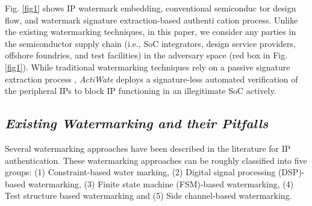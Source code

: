 \documentclass[onecolumn]{IEEEtran}
\begin{document}
 Fig. \ref{fig1} shows IP watermark embedding, conventional semiconduc
tor design flow, and watermark signature extraction-based authenti
cation process. Unlike the existing watermarking techniques, in this
paper, we consider any parties in the semiconductor supply chain
(i.e., SoC integrators, design service providers, offshore foundries,
and test facilities) in the adversary space (red box in Fig. \ref{fig1}).
While traditional watermarking techniques rely on a passive signature
extraction process \cite{Kibria2022_RTL}, \textit{ActiWate} deploys a signature-less automated
verification of the peripheral IPs to block IP functioning in an
illegitimate SoC actively.

\subsection{\textit{Existing Watermarking and their Pitfalls}}
\label{sec2b}
 Several watermarking approaches have been described in the
literature for IP authentication. These watermarking approaches can
be roughly classified into five groups: (1) Constraint-based water
marking, (2) Digital signal processing (DSP)-based watermarking, (3)
Finite state machine (FSM)-based watermarking, (4) Test structure
based watermarking and (5) Side channel-based watermarking.
\end{document}
